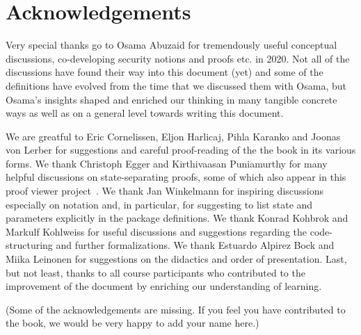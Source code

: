 \section{Acknowledgements}
Very special thanks go to Osama Abuzaid for tremendously useful conceptual discussions, co-developing security notions and proofs etc. in 2020. Not all of the discussions have found their way into this document (yet) and some of the definitions have evolved from the time that we discussed them with Osama, but Osama's insights shaped and enriched our thinking in many tangible concrete ways as well as on a general level towards writing this document.

We are greatful to Eric Cornelissen, Eljon Harlicaj, Pihla Karanko and Joonas von Lerber for suggestions and careful proof-reading of the the book in its various forms. We thank Christoph Egger and Kirthivaasan Puniamurthy for many helpful discussions on state-separating proofs, some of which also appear in this proof viewer project~\cite{X}. We thank Jan Winkelmann for inspiring discussions especially on notation and, in particular, for suggesting to list state and parameters explicitly in the package definitions. We thank Konrad Kohbrok and Markulf Kohlweiss for useful discussions and suggestions regarding the code-structuring and further formalizations. We thank Estuardo Alpirez Bock and Miika Leinonen for suggestions on the didactics and order of presentation. Last, but not least, thanks to all course participants who contributed to the improvement of the document by enriching our understanding of learning.

(Some of the acknowledgements are missing. If you feel you have contributed to the book, we would be very happy to add your name here.)